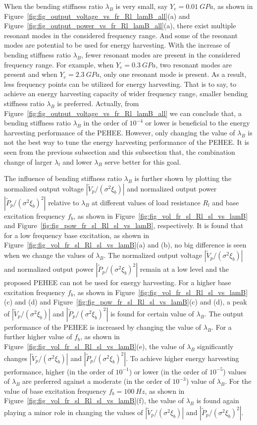 \documentclass{elsarticle}
\begin{document}
When the bending stiffness ratio $\lambda_B$ is very small, say $Y_e = 0.01\ GPa$, as shown in Figure~\ref{fig:fig_output_voltage_vs_fr_Rl_lamB_all}(a) and Figure~\ref{fig:fig_output_power_vs_fr_Rl_lamB_all}(a), there exist multiple resonant modes in the considered frequency range. And some of the resonant modes are potential to be used for energy harvesting. With the increase of bending stiffness ratio $\lambda_B$, fewer resonant modes are present in the considered frequency range. For example, when $Y_e = 0.3\ GPa$, two resonant modes are present and when $Y_e = 2.3\ GPa$, only one resonant mode is present. As a result, less frequency points can be utilized for energy harvesting. That is to say, to achieve an energy harvesting capacity of wider frequency range, smaller bending stiffness ratio $\lambda_B$ is preferred. Actually, from Figure~\ref{fig:fig_output_voltage_vs_fr_Rl_lamB_all} we can conclude that, a bending stiffness ratio $\lambda_B$ in the order of $10^{-4}$ or lower is beneficial to the energy harvesting performance of the PEHEE. However, only changing the value of $\lambda_B$ is not the best way to tune the energy harvesting performance of the PEHEE. It is seen from the previous subsection and this subsection that, the combination change of larger $\lambda_l$ and lower $\lambda_B$ serve better for this goal.


The influence of bending stiffness ratio $\lambda_B$ is further shown by plotting the normalized output voltage $|\tilde{V}_p/(\sigma^2 \xi_b)|$ and normalized output power $|\tilde{P}_p/(\sigma^2 \xi_b)^2|$ relative to $\lambda_B$ at different values of load resistance $R_l$ and base excitation frequency $f_b$, as shown in Figure~\ref{fig:fig_vol_fr_sl_Rl_sl_vs_lamB} and Figure~\ref{fig:fig_pow_fr_sl_Rl_sl_vs_lamB}, respectively. It is found that for a low frequency base excitation, as shown in Figure~\ref{fig:fig_vol_fr_sl_Rl_sl_vs_lamB}(a) and (b), no big difference is seen when we change the values of $\lambda_B$. The normalized output voltage $|\tilde{V}_p/(\sigma^2 \xi_b)|$ and normalized output power $|\tilde{P}_p/(\sigma^2 \xi_b)^2|$ remain at a low level and the proposed PEHEE can not be used for energy harvesting. For a higher base excitation frequency $f_b$, as shown in Figure~\ref{fig:fig_vol_fr_sl_Rl_sl_vs_lamB}(c) and (d) and Figure~\ref{fig:fig_pow_fr_sl_Rl_sl_vs_lamB}(c) and (d), a peak of $|\tilde{V}_p/(\sigma^2 \xi_b)|$ and $|\tilde{P}_p/(\sigma^2 \xi_b)^2|$ is found for certain value of $\lambda_B$. The output performance of the PEHEE is increased by changing the value of $\lambda_B$. For a further higher value of $f_b$, as shown in Figure~\ref{fig:fig_vol_fr_sl_Rl_sl_vs_lamB}(e), the value of $\lambda_B$ significantly changes $|\tilde{V}_p/(\sigma^2 \xi_b)|$ and $|\tilde{P}_p/(\sigma^2 \xi_b)^2|$. To achieve higher energy harvesting performance, higher (in the order of $10^{-1}$) or lower (in the order of $10^{-5}$) values of $\lambda_B$ are preferred against a moderate (in the order of $10^{-3}$) value of $\lambda_B$. For the value of base excitation frequency $f_b = 100\ Hz$, as shown in Figure~\ref{fig:fig_vol_fr_sl_Rl_sl_vs_lamB}(f), the value of $\lambda_B$ is found again playing a minor role in changing the values of $|\tilde{V}_p/(\sigma^2 \xi_b)|$ and $|\tilde{P}_p/(\sigma^2 \xi_b)^2|$.
\end{document}

